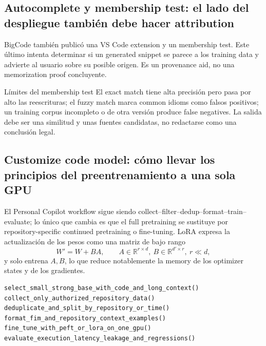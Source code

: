\subsection{Autocomplete y membership test: el lado del despliegue también debe hacer attribution}

BigCode también publicó una VS Code extension y un membership test. Este último intenta determinar si un generated snippet se parece a los training data y advierte al usuario sobre su posible origen. Es un provenance aid, no una memorization proof concluyente.


\begin{knowledgebox}{Límites del membership test}
El exact match tiene alta precisión pero pasa por alto las reescrituras; el fuzzy match marca common idioms como falsos positivos; un training corpus incompleto o de otra versión produce false negatives. La salida debe ser una similitud y unas fuentes candidatas, no redactarse como una conclusión legal.
\end{knowledgebox}


\subsection{Customize code model: cómo llevar los principios del preentrenamiento a una sola GPU}

El Personal Copilot workflow sigue siendo collect--filter--dedup--format--train--evaluate; lo único que cambia es que el full pretraining se sustituye por repository-specific continued pretraining o fine-tuning. LoRA expresa la actualización de los pesos como una matriz de bajo rango
\[
W'=W+BA,\qquad A\in\mathbb{R}^{r\times d},\ B\in\mathbb{R}^{d'\times r},\ r\ll d,
\]
y solo entrena $A,B$, lo que reduce notablemente la memory de los optimizer states y de los gradientes.


\begin{lstlisting}[caption={Ruta ejecutable para un code assistant con presupuesto reducido}]
select_small_strong_base_with_code_and_long_context()
collect_only_authorized_repository_data()
deduplicate_and_split_by_repository_or_time()
format_fim_and_repository_context_examples()
fine_tune_with_peft_or_lora_on_one_gpu()
evaluate_execution_latency_leakage_and_regressions()
\end{lstlisting}

